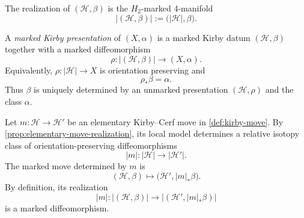 \begin{definition}
\label{def:marked-kirby-realization}
The realization of \((\mathcal H,\beta)\) is the \(H_2\)-marked 4-manifold
\[
  |(\mathcal H,\beta)|:=\bigl(|\mathcal H|,\beta\bigr).
\]
\end{definition}

\begin{definition}
\label{def:marked-kirby-presentation}
A \emph{marked Kirby presentation} of \((X,\alpha)\) is a marked Kirby
datum \((\mathcal H,\beta)\) together with a marked diffeomorphism
\[
  \rho\colon |(\mathcal H,\beta)|\longrightarrow(X,\alpha).
\]
Equivalently, \(\rho\colon|\mathcal H|\to X\) is orientation preserving and
\begin{equation}
  \rho_*\beta=\alpha.
  \label{eq:marked-presentation}
\end{equation}
Thus \(\beta\) is uniquely determined by an unmarked presentation
\((\mathcal H,\rho)\) and the class \(\alpha\).
\end{definition}

\begin{definition}
\label{def:marked-kirby-move}
Let \(m\colon\mathcal H\to\mathcal H'\) be an elementary Kirby--Cerf move
in \cref{def:kirby-move}.  By
\cref{prop:elementary-move-realization}, its local model determines a
relative isotopy class of orientation-preserving
diffeomorphisms
\[
  |m|\colon |\mathcal H|\longrightarrow|\mathcal H'|.
\]
The marked move determined by \(m\) is
\[
  (\mathcal H,\beta)\longmapsto
  \bigl(\mathcal H',|m|_*\beta\bigr).
\]
By definition, its realization
\[
  |m|\colon|(\mathcal H,\beta)|
  \longrightarrow|(\mathcal H',|m|_*\beta)|
\]
is a marked diffeomorphism.
\end{definition}

